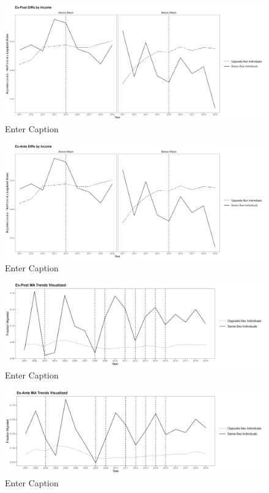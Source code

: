 \documentclass[12pt,letterpaper]{article}
\begin{document}
\begin{figure}
    \centering
    \includegraphics[width=0.75\linewidth]{outputs/summary_stats/inc_post_diffs.png}
    \caption{Enter Caption}
    \label{fig: fig:enter-label}
\end{figure}

\begin{figure}
    \centering
    \includegraphics[width=0.75\linewidth]{outputs/summary_stats/inc_ante_diffs.png}
    \caption{Enter Caption}
    \label{fig: fig:enter-label}
\end{figure}

\begin{figure}
    \centering
    \includegraphics[width=0.75\linewidth]{outputs/summary_stats/MA_post_trends.png}
    \caption{Enter Caption}
    \label{fig: fig:enter-label}
\end{figure}

\begin{figure}
    \centering
    \includegraphics[width=0.75\linewidth]{outputs/summary_stats/MA_ante_trends.png}
    \caption{Enter Caption}
    \label{fig: fig:enter-label}
\end{figure}
\end{document}
